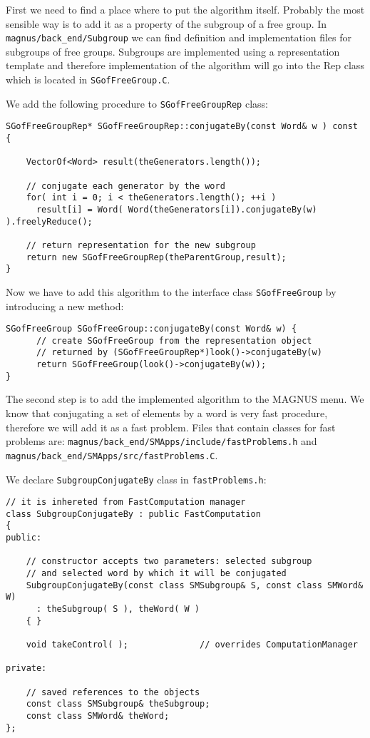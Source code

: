 \documentclass[12pt]{article}
\def\magnus{MAGNUS }
\begin{document}
First we need to find a place where to put the algorithm itself.
Probably the most sensible way is to add it as a property of
the subgroup of a free group. In {\tt magnus/back\_end/Subgroup} we can find
definition and implementation files for subgroups of free groups.
Subgroups are implemented using a representation template and therefore
implementation
of the algorithm will go into the Rep class which is located in
{\tt SGofFreeGroup.C}.

We add the following procedure to {\tt SGofFreeGroupRep} class:

\footnotesize
\begin{verbatim}
SGofFreeGroupRep* SGofFreeGroupRep::conjugateBy(const Word& w ) const
{

    VectorOf<Word> result(theGenerators.length());

    // conjugate each generator by the word
    for( int i = 0; i < theGenerators.length(); ++i )
      result[i] = Word( Word(theGenerators[i]).conjugateBy(w) ).freelyReduce();

    // return representation for the new subgroup
    return new SGofFreeGroupRep(theParentGroup,result);
}
\end{verbatim}
\normalsize

Now we have to add this algorithm to the interface class {\tt SGofFreeGroup}
by introducing a new method:

\footnotesize
\begin{verbatim}
SGofFreeGroup SGofFreeGroup::conjugateBy(const Word& w) {
      // create SGofFreeGroup from the representation object
      // returned by (SGofFreeGroupRep*)look()->conjugateBy(w)
      return SGofFreeGroup(look()->conjugateBy(w));
}
\end{verbatim}
\normalsize

The second step is to add the implemented algorithm to the \magnus menu.
We know that conjugating a set of elements by a word is very
fast procedure, therefore we will add it as a fast problem.
Files that contain classes for fast problems are:
{\tt magnus/back\_end/SMApps/include/fastProblems.h} and
{\tt magnus/back\_end/SMApps/src/fastProblems.C}.

We declare {\tt SubgroupConjugateBy} class in {\tt fastProblems.h}:
\footnotesize
\begin{verbatim}
// it is inhereted from FastComputation manager
class SubgroupConjugateBy : public FastComputation
{
public:

    // constructor accepts two parameters: selected subgroup
    // and selected word by which it will be conjugated
    SubgroupConjugateBy(const class SMSubgroup& S, const class SMWord& W)
      : theSubgroup( S ), theWord( W )
    { }

    void takeControl( );              // overrides ComputationManager

private:

    // saved references to the objects
    const class SMSubgroup& theSubgroup;
    const class SMWord& theWord;
};
\end{verbatim}
\normalsize
\end{document}
